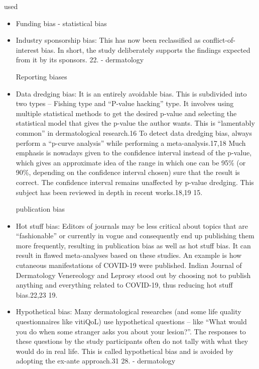 \documentclass[12pt, a4paper, oneside]{book}   	%
\newif\ifrawcitationactive
\newcommand{\rawcitationstart}{\color{purple}\rawcitationactivetrue}
\newcommand{\rawcitationend}{\color{black}\rawcitationactivefalse}
\newcommand{\rawcitationusedstart}{\color{violet}}
\newcommand{\rawcitationusedend}{%
	\ifrawcitationactive
	\color{purple}  %
	\else
	\color{black}  %
	\fi
}
\begin{document}
			\rawcitationstart
			used
			\begin{itemize}		
				\rawcitationusedstart
				\item Funding bias \autocites{Mester_2022}{Mester_2017} - statistical bias
				\item  Industry sponsorship bias: This has now been reclassified as conflict-of-interest bias. In short, the study deliberately supports the findings expected from it by its sponsors. 22.\autocite{Chakraborty_2024} - dermatology
				
				Reporting biases
				\item  Data dredging bias: It is an entirely avoidable bias. This is subdivided into two types – Fishing type and “P-value hacking” type. It involves using multiple statistical methods to get the desired p-value and selecting the statistical model that gives the p-value the author wants. This is “lamentably common” in dermatological research.16 To detect data dredging bias, always perform a “p-curve analysis” while performing a meta-analysis.17,18 Much emphasis is nowadays given to the confidence interval instead of the p-value, which gives an approximate idea of the range in which one can be 95\% (or 90\%, depending on the confidence interval chosen) sure that the result is correct. The confidence interval remains unaffected by p-value dredging. This subject has been reviewed in depth in recent works.18,19 15.\autocite{Chakraborty_2024}
				
				publication bias 
				\item Hot stuff bias: Editors of journals may be less critical about topics that are “fashionable” or currently in vogue and consequently end up publishing them more frequently, resulting in publication bias as well as hot stuff bias. It can result in flawed meta-analyses based on these studies. An example is how cutaneous manifestations of COVID-19 were published. Indian Journal of Dermatology Venereology and Leprosy stood out by choosing not to publish anything and everything related to COVID-19, thus reducing hot stuff bias.22,23 19. \autocite{Chakraborty_2024}
				
				\item Hypothetical bias: Many dermatological researches (and some life quality questionnaires like vitiQoL) use hypothetical questions – like “What would you do when some stranger asks you about your lesion?”. The responses to these questions by the study participants often do not tally with what they would do in real life. This is called hypothetical bias and is avoided by adopting the ex-ante approach.31 28. \autocite{Chakraborty_2024} - dermatology
				\rawcitationusedend
			\end{itemize}
			\rawcitationend
			
\end{document}
